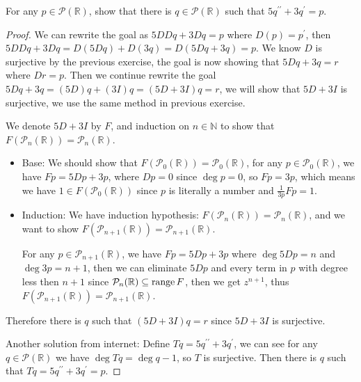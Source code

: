 \documentclass[../main.tex]{subfiles}
\begin{document}
\begin{exercise}
  For any $p \in \mathcal{P}(\mathbb{R})$, show that there is $q \in \mathcal{P}(\mathbb{R})$ such that $5q^{\prime\prime} + 3q^\prime = p$.
\end{exercise}
\begin{proof}
  We can rewrite the goal as $5DDq + 3Dq = p$ where $D(p) = p^\prime$,
  then $5DDq + 3Dq = D(5Dq) + D(3q) = D(5Dq + 3q) = p$. We know $D$ is surjective
  by the previous exercise, the goal is now showing that $5Dq + 3q = r$ where $Dr = p$.
  Then we continue rewrite the goal $5Dq + 3q = (5D)q + (3I)q = (5D + 3I)q = r$,
  we will show that $5D + 3I$ is surjective, we use the same method in previous exercise.

  We denote $5D + 3I$ by $F$, and induction on $n \in \mathbb{N}$ to show that
  $F(\mathcal{P}_n(\mathbb{R})) = \mathcal{P}_n(\mathbb{R})$.
  \begin{itemize}
    \item Base: We should show that $F(\mathcal{P}_0(\mathbb{R})) = \mathcal{P}_0(\mathbb{R})$,
          for any $p \in \mathcal{P}_0(\mathbb{R})$, we have $Fp = 5Dp + 3p$, where $Dp = 0$ since $\deg p = 0$,
          so $Fp = 3p$, which means we have $1 \in F(\mathcal{P}_0(\mathbb{R}))$ since $p$ is literally a number and $\frac{1}{3p}Fp = 1$.
    \item Induction: We have induction hypothesis: $F(\mathcal{P}_n(\mathbb{R})) = \mathcal{P}_n(\mathbb{R})$,
          and we want to show $F(\mathcal{P}_{n + 1}(\mathbb{R})) = \mathcal{P}_{n + 1}(\mathbb{R})$.

          For any $p \in \mathcal{P}_{n + 1}(\mathbb{R})$, we have $Fp = 5Dp + 3p$
          where $\deg 5Dp = n$ and $\deg 3p = n + 1$, then we can eliminate $5Dp$ and
          every term in $p$ with degree less then $n + 1$ since $\mathcal{P}_n(\mathbb{R}) \subseteq \operatorname{range} F$,
          then we get $z^{n + 1}$, thus $F(\mathcal{P}_{n + 1}(\mathbb{R})) = \mathcal{P}_{n + 1}(\mathbb{R})$.
  \end{itemize}

  Therefore there is $q$ such that $(5D + 3I)q = r$ since $5D + 3I$ is surjective.

  Another solution from internet: Define $Tq = 5q^{\prime\prime} + 3q^\prime$, we can see
  for any $q \in \mathcal{P}(\mathbb{R})$ we have $\deg Tq = \deg q - 1$,
  so $T$ is surjective. Then there is $q$ such that $Tq = 5q^{\prime\prime} + 3q^\prime = p$.
\end{proof}
\end{document}
